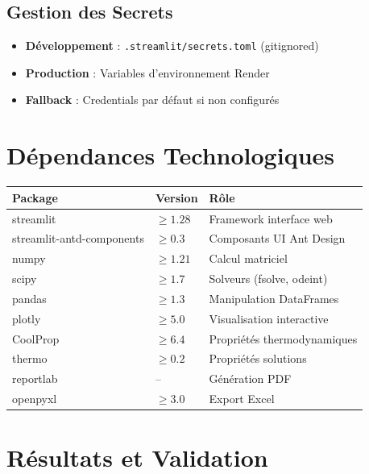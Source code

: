 \documentclass[12pt,a4paper,twoside]{article}
\begin{document}
\subsection{Gestion des Secrets}

\begin{itemize}[noitemsep]
    \item \textbf{Développement} : \texttt{.streamlit/secrets.toml} (gitignored)
    \item \textbf{Production} : Variables d'environnement Render
    \item \textbf{Fallback} : Credentials par défaut si non configurés
\end{itemize}

\section{Dépendances Technologiques}

\begin{table}[htbp]
\centering
\small
\begin{tabular}{llp{5.5cm}}
\toprule
\textbf{Package} & \textbf{Version} & \textbf{Rôle} \\
\midrule
streamlit & $\geq 1.28$ & Framework interface web \\
streamlit-antd-components & $\geq 0.3$ & Composants UI Ant Design \\
numpy & $\geq 1.21$ & Calcul matriciel \\
scipy & $\geq 1.7$ & Solveurs (fsolve, odeint) \\
pandas & $\geq 1.3$ & Manipulation DataFrames \\
plotly & $\geq 5.0$ & Visualisation interactive \\
CoolProp & $\geq 6.4$ & Propriétés thermodynamiques \\
thermo & $\geq 0.2$ & Propriétés solutions \\
reportlab & -- & Génération PDF \\
openpyxl & $\geq 3.0$ & Export Excel \\
\bottomrule
\end{tabular}
\end{table}

\section{Résultats et Validation}
\end{document}
